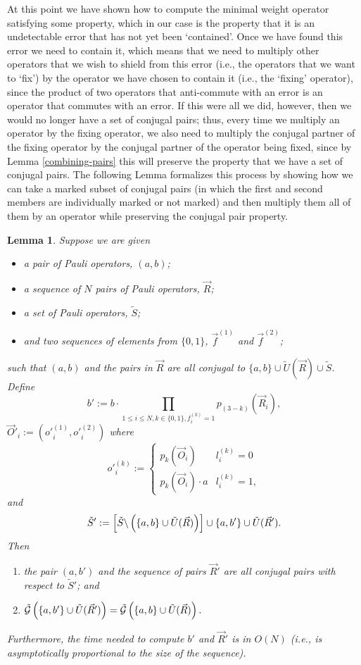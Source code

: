 \documentclass[twocolumn,showpacs,preprintnumbers,amsmath,amssymb,nofootinbib,pra,floatfix]{revtex4-1}
\newtheorem{lemma}{Lemma}
\newenvironment{remark}[1][Remark]{\begin{trivlist}
\item[\hskip \labelsep {\bfseries #1}]}{\end{trivlist}}
\newcommand{\lst}{\vec}
\newcommand{\set}{\tilde}
\newcommand{\genfun}{\tilde{\mathcal{G}}}
\begin{document}
\begin{remark}
At this point we have shown how to compute the minimal weight operator satisfying some property, which in our case is the property that it is an undetectable error that has not yet been `contained'.  Once we have found this error we need to contain it, which means that we need to multiply other operators that we wish to shield from this error (i.e., the operators that we want to `fix') by the operator we have chosen to contain it (i.e., the `fixing' operator), since the product of two operators that anti-commute with an error is an operator that commutes with an error.  If this were all we did, however, then we would no longer have a set of conjugal pairs;  thus, every time we multiply an operator by the fixing operator, we also need to multiply the conjugal partner of the fixing operator by the conjugal partner of the operator being fixed, since by Lemma \ref{combining-pairs} this will preserve the property that we have a set of conjugal pairs.  The following Lemma formalizes this process by showing how we can take a marked subset of conjugal pairs (in which the first and second members are individually marked or not marked) and then multiply them all of them by an operator while preserving the conjugal pair property. 
\end{remark}

\begin{lemma}
\label{multiple-recombinations}
Suppose we are given
\begin{itemize}
\item a pair of Pauli operators, $(a,b)$;
\item a sequence of $N$ pairs of Pauli operators, $\lst R$;
\item a set of Pauli operators, $\set S$;
\item and two sequences of elements from $\{0,1\}$, $\lst f^{(1)}$ and $\lst f^{(2)}$;
\end{itemize}
such that $(a,b)$ and the pairs in $\lst R$ are all conjugal to $\{a,b\}\cup\set U(\lst R)\cup\set S$.  Define
$$b':=b\cdot\prod_{1 \le i \le N, k \in \{0,1\}, f^{(k)}_i=1}p_{(3-k)}(\lst R_i),$$
$\lst O'_i := (o'^{(1)}_i,o'^{(2)}_i)$ where
$$o'^{(k)}_i :=
\begin{cases}
p_k(\lst O_i) & l^{(k)}_i = 0\\
p_k(\lst O_i) \cdot a & l^{(k)}_i = 1,
\end{cases}
$$
and
$$\set S' := \left[\set S\backslash\paren{\{a,b\} \cup \set U(\lst R)}\right]\cup \{a,b'\} \cup \set U(\lst R').$$
Then
\begin{enumerate}
\item the pair $(a,b')$ and the sequence of pairs $\lst R'$ are all conjugal pairs with respect to $\set S'$; and
\item $\genfun\paren{\{a,b'\}\cup \set U(\lst R')}=\genfun\paren{\{a,b\}\cup \set U(\lst R)}.$
\end{enumerate}
Furthermore, the time needed to compute $b'$ and $\lst R'$ is in $O(N)$ (i.e., is asymptotically proportional to the size of the sequence).
\end{lemma}
\end{document}
